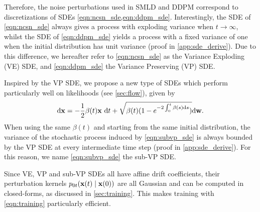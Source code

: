 Therefore, the noise perturbations used in SMLD and DDPM correspond to discretizations of SDEs \cref{eqn:ncsn_sde,eqn:ddpm_sde}. Interestingly, the SDE of \cref{eqn:ncsn_sde} always gives a process with exploding variance when $t \to \infty$, whilst the SDE of \cref{eqn:ddpm_sde} yields a process with a fixed variance of one when the initial distribution has unit variance (proof in \cref{app:sde_derive}). Due to this difference, we hereafter refer to \cref{eqn:ncsn_sde} as the Variance Exploding (VE) SDE, and \cref{eqn:ddpm_sde} the Variance Preserving (VP) SDE. 

Inspired by the VP SDE, we propose a new type of SDEs which perform particularly well on likelihoods (see \cref{sec:flow}), given by
\begin{align}
    \mathrm{d} \mathbf{x} = -\frac{1}{2}\beta(t) \mathbf{x}~ \mathrm{d} t + \sqrt{\beta(t)(1 - e^{-2\int_0^t \beta(s)\mathrm{d} s})} \mathrm{d} \mathbf{w}.\label{eqn:subvp_sde}
\end{align}
When using the same $\beta(t)$ and starting from the same initial distribution, the variance of the stochastic process induced by \cref{eqn:subvp_sde} is always bounded by the VP SDE at every intermediate time step (proof in \cref{app:sde_derive}). For this reason, we name \cref{eqn:subvp_sde} the sub-VP SDE.

Since VE, VP and sub-VP SDEs all have affine drift coefficients, their perturbation kernels $p_{0t}(\mathbf{x}(t) \mid \mathbf{x}(0))$ are all Gaussian and can be computed in closed-forms, as discussed in \cref{sec:training}. This makes training with \cref{eqn:training} particularly efficient. 







